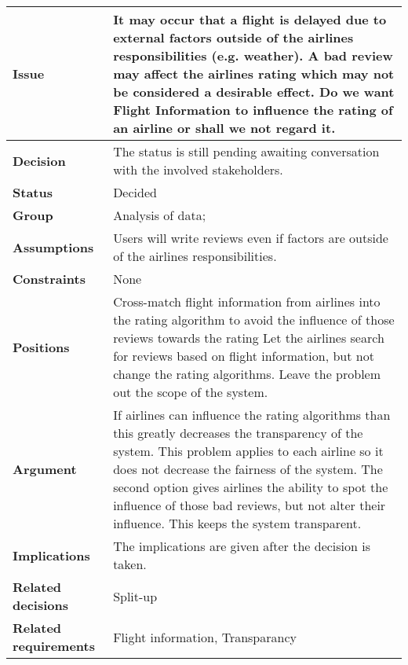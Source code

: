 
\label{dd:flight-inf}
\begin{tabular}{ l  p{10cm}}
\hline
\bf Issue & It may occur that a flight is delayed due to external factors outside of the airlines responsibilities (e.g. weather). A bad review may affect the airlines rating which may not be considered a desirable effect. Do we want Flight Information to influence the rating of an airline or shall we not regard it. \\
\hline
\bf Decision & The status is still pending awaiting conversation with the involved stakeholders. \\
\hline
\bf Status & Decided \\
\hline
\bf Group & Analysis of data; \\
\hline
\bf Assumptions & Users will write reviews even if factors are outside of the airlines responsibilities. \\
\hline
\bf Constraints & None \\
\hline
\bf Positions & Cross-match flight information from airlines into the rating algorithm to avoid the influence of those reviews towards the rating \newline\newline
Let the airlines search for reviews based on flight information, but not change the rating algorithms. \newline\newline
Leave the problem out the scope of the system. \\
\hline
\bf Argument & If airlines can influence the rating algorithms than this greatly decreases the transparency of the system. This problem applies to each airline so it does not decrease the fairness of the system. The second option gives airlines the ability to spot the influence of those bad reviews, but not alter their influence. This keeps the system transparent. \\
\hline
\bf Implications &The implications are given after the decision is taken. \\
\hline
\bf Related decisions & Split-up \\
\hline
\bf Related requirements  & Flight information, Transparancy \\
\hline
\end{tabular}
